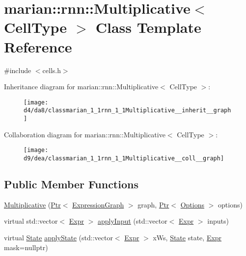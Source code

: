 \hypertarget{classmarian_1_1rnn_1_1Multiplicative}{}\section{marian\+:\+:rnn\+:\+:Multiplicative$<$ Cell\+Type $>$ Class Template Reference}
\label{classmarian_1_1rnn_1_1Multiplicative}


{\ttfamily \#include $<$cells.\+h$>$}



Inheritance diagram for marian\+:\+:rnn\+:\+:Multiplicative$<$ Cell\+Type $>$\+:
\nopagebreak
\begin{figure}[H]
\begin{center}
\leavevmode
\texttt{[image: d4/da8/classmarian\_1\_1rnn\_1\_1Multiplicative\_\_inherit\_\_graph]}
\end{center}
\end{figure}


Collaboration diagram for marian\+:\+:rnn\+:\+:Multiplicative$<$ Cell\+Type $>$\+:
\nopagebreak
\begin{figure}[H]
\begin{center}
\leavevmode
\texttt{[image: d9/dea/classmarian\_1\_1rnn\_1\_1Multiplicative\_\_coll\_\_graph]}
\end{center}
\end{figure}
\subsection*{Public Member Functions}
\begin{DoxyCompactItemize}
\item 
\hyperlink{classmarian_1_1rnn_1_1Multiplicative_a0e9039699e77cdb7275ee0cd8dfc6f3b}{Multiplicative} (\hyperlink{namespacemarian_ad1a373be43a00ef9ce35666145137b08}{Ptr}$<$ \hyperlink{classmarian_1_1ExpressionGraph}{Expression\+Graph} $>$ graph, \hyperlink{namespacemarian_ad1a373be43a00ef9ce35666145137b08}{Ptr}$<$ \hyperlink{classmarian_1_1Options}{Options} $>$ options)
\item 
virtual std\+::vector$<$ \hyperlink{namespacemarian_a498d8baf75b754011078b890b39c8e12}{Expr} $>$ \hyperlink{classmarian_1_1rnn_1_1Multiplicative_a8d4602eb7c00be9413f304824661138c}{apply\+Input} (std\+::vector$<$ \hyperlink{namespacemarian_a498d8baf75b754011078b890b39c8e12}{Expr} $>$ inputs)
\item 
virtual \hyperlink{structmarian_1_1rnn_1_1State}{State} \hyperlink{classmarian_1_1rnn_1_1Multiplicative_a0430765759edad7fc7181ef921d3118b}{apply\+State} (std\+::vector$<$ \hyperlink{namespacemarian_a498d8baf75b754011078b890b39c8e12}{Expr} $>$ x\+Ws, \hyperlink{structmarian_1_1rnn_1_1State}{State} state, \hyperlink{namespacemarian_a498d8baf75b754011078b890b39c8e12}{Expr} mask=nullptr)
\end{DoxyCompactItemize}
